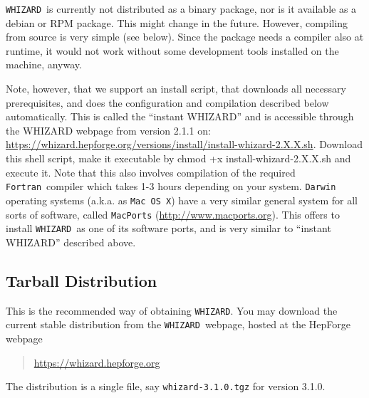 \documentclass[12pt]{book}
\newcommand{\hepforgepage}{\url{https://whizard.hepforge.org}}
\newenvironment{interaction}%
  {\begingroup\small
   \Verbatim}%
  {\endVerbatim
   \endgroup\noindent}
\newcommand{\ttt}[1]{\texttt{#1}}
\newcommand{\whizard}{\ttt{WHIZARD}}
\newcommand{\fortran}{\ttt{Fortran}}
\newcommand{\thisversion}{3.1.0}
\begin{document}
\whizard\ is currently not distributed as a binary package, nor is it
available as a debian or RPM package.  This might change in the
future.  However, compiling from source is very simple (see below).
Since the package needs a compiler also at runtime, it would not work
without some development tools installed on the machine, anyway.

Note, however, that we support an install script, that downloads all
necessary prerequisites, and does the configuration and compilation
described below automatically. This is called the ``instant WHIZARD''
and is accessible through the WHIZARD webpage from version 2.1.1 on:
\url{https://whizard.hepforge.org/versions/install/install-whizard-2.X.X.sh}.
Download this shell script, make it executable by
\begin{interaction}
  chmod +x install-whizard-2.X.X.sh
\end{interaction}
and execute it. Note that this also involves compilation of the
required \fortran\ compiler which takes 1-3 hours depending on
your system.
\ttt{Darwin} operating systems (a.k.a. as \ttt{Mac OS X}) have a very
similar general system for all sorts of software, called
\ttt{MacPorts} (\url{http://www.macports.org}). This offers to install
\whizard\ as one of its software ports, and is very similar to
``instant WHIZARD'' described above.


\subsection{Tarball Distribution}
\label{sec:tarballdistr}

This is the recommended way of obtaining \whizard.  You may download
the current stable distribution from the \whizard\ webpage,
hosted at the HepForge webpage
\begin{quote}
  \hepforgepage
\end{quote}
The distribution is a single file, say \ttt{whizard-\thisversion.tgz} for
version \thisversion.
\end{document}
